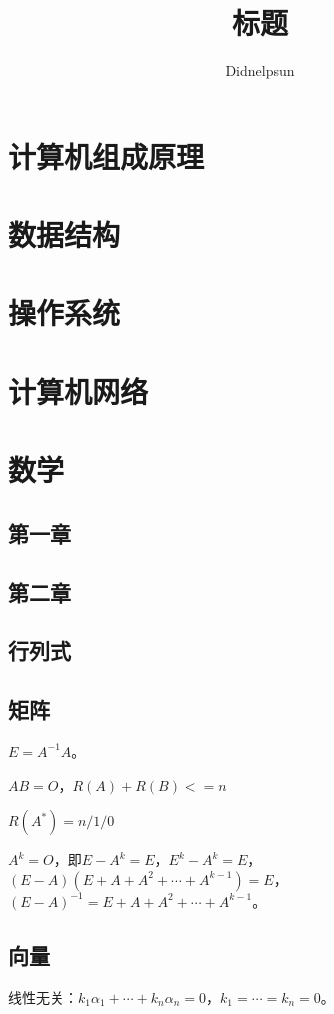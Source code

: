 \documentclass[UTF8, 12pt]{ctexart}
\author{Didnelpsun}
\title{标题}
\date{}
\begin{document}
\maketitle
\pagestyle{empty}
\thispagestyle{empty}
\tableofcontents
\thispagestyle{empty}
\newpage
\pagestyle{plain}
\setcounter{page}{1}
\section{计算机组成原理}
\section{数据结构}
\section{操作系统}
\section{计算机网络}
\section{数学}
\subsection{第一章}
\subsection{第二章}
\subsection{行列式}
\subsection{矩阵}

$E=A^{-1}A$。

$AB=O$，$R(A)+R(B)<=n$

$R(A^*)=n/1/0$

$A^k=O$，即$E-A^k=E$，$E^k-A^k=E$，$(E-A)(E+A+A^2+\cdots+A^{k-1})=E$，$(E-A)^{-1}=E+A+A^2+\cdots+A^{k-1}$。
\subsection{向量}

线性无关：$k_1\alpha_1+\cdots+k_n\alpha_n=0$，$k_1=\cdots=k_n=0$。
\end{document}
